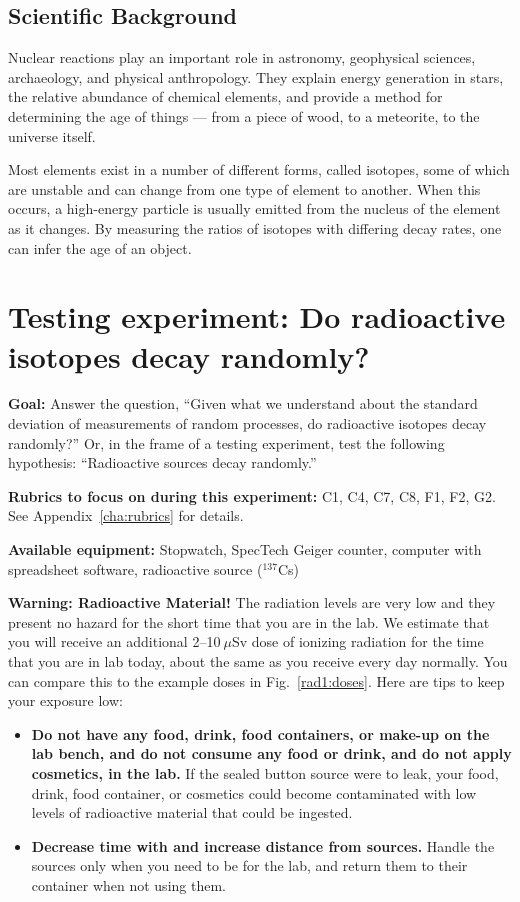 \subsection{Scientific Background}

Nuclear reactions play an important role in astronomy, geophysical sciences, archaeology, and physical anthropology. They explain energy generation in stars, the relative abundance of chemical elements, and provide a method for determining the age of things --- from a piece of wood, to a meteorite, to the universe itself.

Most elements exist in a number of different forms, called isotopes, some of which are unstable and can change from one type of element to another. When this occurs, a high-energy particle is usually emitted from the nucleus of the element as it changes. By measuring the ratios of isotopes with differing decay rates, one can infer the age of an object.

\section{Testing experiment: Do radioactive isotopes decay randomly?}

\textbf{Goal:} Answer the question, ``Given what we understand about the standard deviation of measurements of random processes, do radioactive isotopes decay randomly?'' Or, in the frame of a testing experiment, test the following hypothesis: ``Radioactive sources decay randomly.''

\textbf{Rubrics to focus on during this experiment:} C1, C4, C7, C8, F1, F2, G2. See Appendix~\ref{cha:rubrics} for details.

\textbf{Available equipment:} Stopwatch, SpecTech Geiger counter, computer with spreadsheet software, radioactive source ($^{137}$Cs)

\begin{framed}
	\textbf{Warning: Radioactive Material!} The radiation levels are very low and they present no hazard for the short time that you are in the lab. We estimate that you will receive an additional 2--10$\:\mu$Sv dose of ionizing radiation for the time that you are in lab today, about the same as you receive every day normally. You can compare this to the example doses in Fig.~\ref{rad1:doses}. Here are tips to keep your exposure low:
	\begin{itemize}
		\item \textbf{Do not have any food, drink, food containers, or make-up on the lab bench, and do not consume any food or drink, and do not apply cosmetics, in the lab.}
		If the sealed button source were to leak, your food, drink, food container, or cosmetics could become contaminated with low levels of radioactive material that could be ingested.
		
		\item \textbf{Decrease time with and increase distance from sources.} Handle the sources only when you need to be for the lab, and return them to their container when not using them.
	\end{itemize}
\end{framed}

